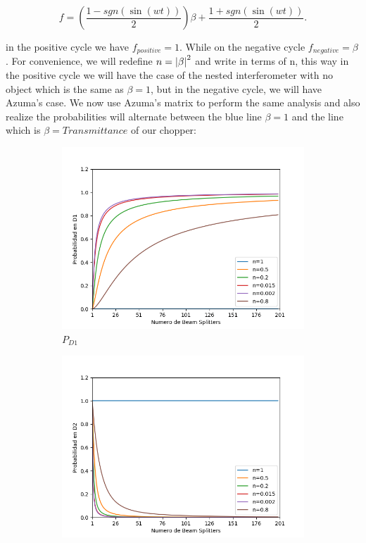 \documentclass[12pt]{book}
\begin{document}
\begin{equation}
f=\left(\frac{1-sgn(\sin(wt))}{2} \right)\beta+\frac{1+sgn(\sin(wt))}{2}.
\end{equation}

in the positive cycle we have $f_{positive}=1$. While on the negative cycle $f_{negative}=\beta$. For convenience, we will redefine $n=\abs{\beta}^{2}$ and write in terms of n, this way in the positive cycle we will have the case of the nested interferometer with no object which is the same as  $\beta=1$, but in the negative cycle, we will have  Azuma's case. We now use Azuma's matrix to perform the same analysis and also realize the probabilities will alternate between the blue line $\beta=1$ and the line which is $\beta=Transmittance$ of our chopper:


 \begin{figure}[!htb]
\centering
\begin{subfigure}[b]{0.45\linewidth}
\includegraphics[width=\linewidth]{images/ChopperD1.png}
\caption{$P_{D1}$}
\label{fig:BS1}
\end{subfigure}
\begin{subfigure}[b]{0.45\linewidth}
\includegraphics[width=\linewidth]{images/ChopperD2.png}

\end{subfigure}
\end{figure}
\end{document}
